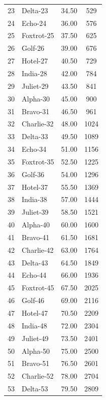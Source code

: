 \documentclass[10pt]{article}
\begin{document}
\begin{longtable}{@{}r l S[table-format=3.2] S[table-format=4.0]@{}}
23 & Delta-23 & \num{34.50} & \num{529} \\
24 & Echo-24 & \num{36.00} & \num{576} \\
25 & Foxtrot-25 & \num{37.50} & \num{625} \\
26 & Golf-26 & \num{39.00} & \num{676} \\
27 & Hotel-27 & \num{40.50} & \num{729} \\
28 & India-28 & \num{42.00} & \num{784} \\
29 & Juliet-29 & \num{43.50} & \num{841} \\
30 & Alpha-30 & \num{45.00} & \num{900} \\
31 & Bravo-31 & \num{46.50} & \num{961} \\
32 & Charlie-32 & \num{48.00} & \num{1024} \\
33 & Delta-33 & \num{49.50} & \num{1089} \\
34 & Echo-34 & \num{51.00} & \num{1156} \\
35 & Foxtrot-35 & \num{52.50} & \num{1225} \\
36 & Golf-36 & \num{54.00} & \num{1296} \\
37 & Hotel-37 & \num{55.50} & \num{1369} \\
38 & India-38 & \num{57.00} & \num{1444} \\
39 & Juliet-39 & \num{58.50} & \num{1521} \\
40 & Alpha-40 & \num{60.00} & \num{1600} \\
41 & Bravo-41 & \num{61.50} & \num{1681} \\
42 & Charlie-42 & \num{63.00} & \num{1764} \\
43 & Delta-43 & \num{64.50} & \num{1849} \\
44 & Echo-44 & \num{66.00} & \num{1936} \\
45 & Foxtrot-45 & \num{67.50} & \num{2025} \\
46 & Golf-46 & \num{69.00} & \num{2116} \\
47 & Hotel-47 & \num{70.50} & \num{2209} \\
48 & India-48 & \num{72.00} & \num{2304} \\
49 & Juliet-49 & \num{73.50} & \num{2401} \\
50 & Alpha-50 & \num{75.00} & \num{2500} \\
51 & Bravo-51 & \num{76.50} & \num{2601} \\
52 & Charlie-52 & \num{78.00} & \num{2704} \\
53 & Delta-53 & \num{79.50} & \num{2809} \\

\end{longtable}
\end{document}
